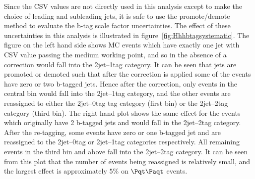 Since the \ac{CSV} values are not directly used in this analysis except to make
the choice of leading and subleading jets, it is safe to use the promote/demote
method to evaluate the b-tag scale factor uncertainties. The effect of these uncertainties 
in this analysis is illustrated in figure~\ref{fig:Hhhbtagsystematic}. The figure on the left hand
side shows \ac{MC} events which have exactly one jet with \ac{CSV} value passing the medium
working point, and so in the absence of a correction would fall into the
2jet--1tag category. It can be seen that jets are promoted or demoted such that
after the correction is applied some of the events have zero or two b-tagged
jets. Hence after the correction, only events in the central bin would fall into
the 2jet--1tag category, and the other events are reassigned to either the
2jet--0tag tag category (first bin) or the 2jet--2tag category (third bin). The
right hand plot shows the same effect for the events which originally have 2
b-tagged jets and would fall in the 2jet--2tag category. After the re-tagging,
some events have zero or one b-tagged jet and are reassigned to the 2jet--0tag
or 2jet--1tag categories respectively. All remaining events in the third bin and
above fall into the 2jet--2tag category. It can be seen from this plot that the
number of events being reassigned is relatively small, and the largest effect is
approximately $5\%$ on $\ttbar$ events.

